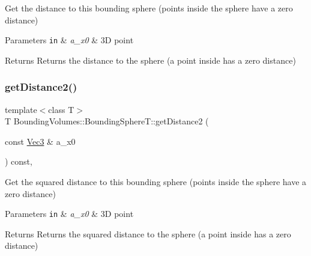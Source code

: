 Get the distance to this bounding sphere (points inside the sphere have a zero distance) 


\begin{DoxyParams}[1]{Parameters}
\mbox{\tt in}  & {\em a\+\_\+x0} & 3D point \\
\hline
\end{DoxyParams}
\begin{DoxyReturn}{Returns}
Returns the distance to the sphere (a point inside has a zero distance) 
\end{DoxyReturn}
\mbox{\label{classEBGeometry_1_1BoundingVolumes_1_1BoundingSphereT_af34b67dfb55ff102bda80b76a90e28d6}} 
\subsubsection{\texorpdfstring{get\+Distance2()}{getDistance2()}}
{\footnotesize\ttfamily template$<$class T$>$ \\
T Bounding\+Volumes\+::\+Bounding\+Sphere\+T\+::get\+Distance2 (\begin{DoxyParamCaption}\item[{const \hyperlink{classEBGeometry_1_1BoundingVolumes_1_1BoundingSphereT_a65cef119542a4c7c1cabb1ea36f40336}{Vec3} \&}]{a\+\_\+x0 }\end{DoxyParamCaption}) const\hspace{0.3cm}{\ttfamily [inline]}, {\ttfamily [noexcept]}}



Get the squared distance to this bounding sphere (points inside the sphere have a zero distance) 


\begin{DoxyParams}[1]{Parameters}
\mbox{\tt in}  & {\em a\+\_\+x0} & 3D point \\
\hline
\end{DoxyParams}
\begin{DoxyReturn}{Returns}
Returns the squared distance to the sphere (a point inside has a zero distance) 
\end{DoxyReturn}
\mbox{\label{classEBGeometry_1_1BoundingVolumes_1_1BoundingSphereT_aac6c4e803bf7eb25123d17eede0555a2}} 
